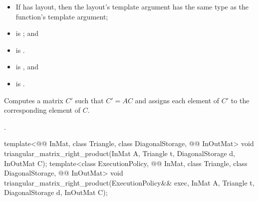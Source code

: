 \begin{itemdescr}
\pnum
\mandates
\begin{itemize}
\item
If  has  layout,
then the layout's  template argument has
the same type as the function's  template argument;
\item
{}
is ; and
\item
{} is .
\end{itemize}

\pnum
\expects
\begin{itemize}
\item
{} is , and
\item
{} is .
\end{itemize}

\pnum
\effects
Computes a matrix $C'$ such that $C' = A C$ and
assigns each element of $C'$ to the corresponding element of $C$.

\pnum
\complexity
{}.
\end{itemdescr}

%
\begin{itemdecl}
template<@@ InMat, class Triangle, class DiagonalStorage, @@ InOutMat>
  void triangular_matrix_right_product(InMat A, Triangle t, DiagonalStorage d, InOutMat C);
template<class ExecutionPolicy,
         @@ InMat, class Triangle, class DiagonalStorage, @@ InOutMat>
  void triangular_matrix_right_product(ExecutionPolicy&& exec,
                                       InMat A, Triangle t, DiagonalStorage d, InOutMat C);
\end{itemdecl}

